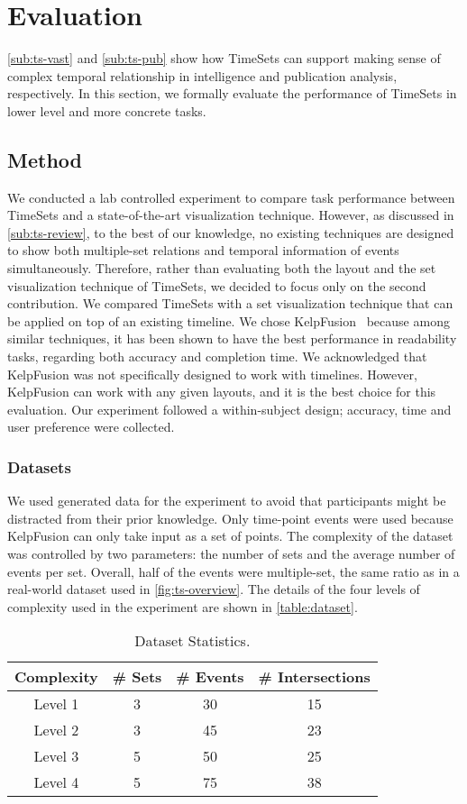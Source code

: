 \section{Evaluation}
\autoref{sub:ts-vast} and \autoref{sub:ts-pub} show how TimeSets can support making sense of complex temporal relationship in intelligence and publication analysis, respectively. In this section, we formally evaluate the performance of TimeSets in lower level and more concrete tasks.

\subsection{Method}
We conducted a lab controlled experiment to compare task performance between TimeSets and a state-of-the-art visualization technique. However, as discussed in \autoref{sub:ts-review}, to the best of our knowledge, no existing techniques are designed to show both multiple-set relations and temporal information of events simultaneously. Therefore, rather than evaluating both the layout and the set visualization technique of TimeSets, we decided to focus only on the second contribution. We compared TimeSets with a set visualization technique that can be applied on top of an existing timeline. We chose KelpFusion~\cite{Meulemans2013} because among similar techniques, it has been shown to have the best performance in readability tasks, regarding both accuracy and completion time. We acknowledged that KelpFusion was not specifically designed to work with timelines. However, KelpFusion can work with any given layouts, and it is the best choice for this evaluation. Our experiment followed a within-subject design; accuracy, time and user preference were collected.

\subsubsection{Datasets}
We used generated data for the experiment to avoid that participants might be distracted from their prior knowledge. Only time-point events were used because KelpFusion can only take input as a set of points. The complexity of the dataset was controlled by two parameters: the number of sets and the average number of events per set. Overall, half of the events were multiple-set, the same ratio as in a real-world dataset used in \autoref{fig:ts-overview}. The details of the four levels of complexity used in the experiment are shown in \autoref{table:dataset}.

\begin{table}[!htb]
\centering
\sffamily\small
\caption{Dataset Statistics.}
\label{table:dataset}
\begin{tabular}{cccc}
	\toprule
	\textbf{Complexity} & \textbf{\# Sets} & \textbf{\# Events} & \textbf{\# Intersections} \\
	\midrule
	Level 1 & 3 & 30 & 15 \\
	Level 2 & 3 & 45 & 23 \\
	Level 3 & 5 & 50 & 25 \\
	Level 4 & 5 & 75 & 38 \\
	\bottomrule
\end{tabular}
\end{table}

